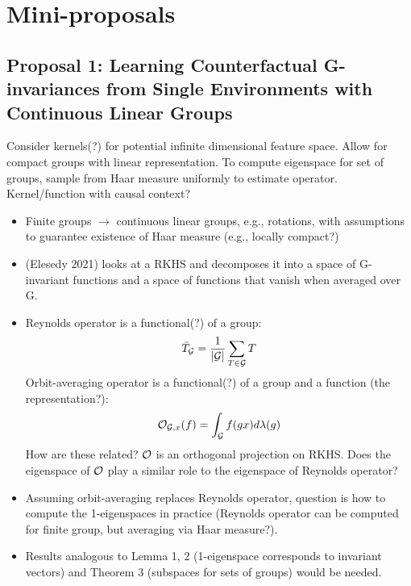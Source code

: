 

\section{Mini-proposals}

\subsection{Proposal 1: Learning Counterfactual G-invariances from Single Environments with Continuous Linear Groups}

Consider kernels(?) for potential infinite dimensional feature space. Allow for compact groups with linear representation. To compute eigenspace for set of groups, sample from Haar measure uniformly to estimate operator. Kernel/function with causal context?

\begin{itemize}

\item
Finite groups $\rightarrow$ continuous linear groups, e.g., rotations, with assumptions to guarantee existence of Haar measure (e.g., locally compact?)

\item
(Elesedy 2021) looks at a RKHS and decomposes it into a space of G-invariant functions and a space of functions that vanish when averaged over G.

\item
Reynolds operator is a functional(?) of a group:
\[
\bar{T}_{\mathcal{G}} = \frac{1}{|\mathcal{G}|}\sum_{T\in\mathcal{G}}T
\]
Orbit-averaging operator is a functional(?) of a group and a function (the representation?):
\[
\mathcal{O}_{\mathcal{G},x}(f) = \int_{\mathcal{G}} f(gx)d\lambda(g)
\]
How are these related? $\mathcal{O}$ is an orthogonal projection on RKHS. Does the eigenspace of $\mathcal{O}$ play a similar role to the eigenspace of Reynolds operator?

\item
Assuming orbit-averaging replaces Reynolds operator, question is how to compute the 1-eigenspaces in practice (Reynolds operator can be computed for finite group, but averaging via Haar measure?).

\item
Results analogous to Lemma 1, 2 (1-eigenspace corresponds to invariant vectors) and Theorem 3 (subspaces for sets of groups) would be needed.

\end{itemize}


